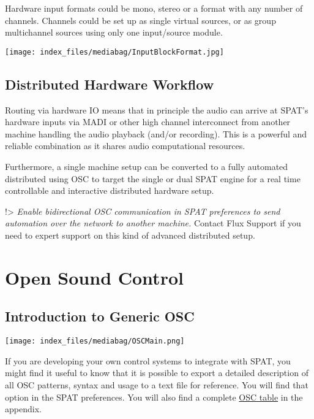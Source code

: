 \documentclass[
  letterpaper,
  DIV=11,
  numbers=noendperiod]{scrreport}
\begin{document}
Hardware input formats could be mono, stereo or a format with any number
of channels. Channels could be set up as single virtual sources, or as
group multichannel sources using only one input/source module.

\texttt{[image: index\_files/mediabag/InputBlockFormat.jpg]}

\hypertarget{distributed-hardware-workflow}{%
\section{Distributed Hardware
Workflow}\label{distributed-hardware-workflow}}

Routing via hardware IO means that in principle the audio can arrive at
SPAT's hardware inputs via MADI or other high channel interconnect from
another machine handling the audio playback (and/or recording). This is
a powerful and reliable combination as it shares audio computational
resources.

Furthermore, a single machine setup can be converted to a fully
automated distributed using OSC to target the single or dual SPAT engine
for a real time controllable and interactive distributed hardware setup.

!\textgreater{} \emph{Enable bidirectional OSC communication in SPAT
preferences to send automation over the network to another machine.}
Contact Flux Support if you need to expert support on this kind of
advanced distributed setup.

\hypertarget{open-sound-control}{%
\chapter{Open Sound Control}\label{open-sound-control}}

\hypertarget{introduction-to-generic-osc}{%
\section{Introduction to Generic
OSC}\label{introduction-to-generic-osc}}

\texttt{[image: index\_files/mediabag/OSCMain.png]}

If you are developing your own control systems to integrate with SPAT,
you might find it useful to know that it is possible to export a
detailed description of all OSC patterns, syntax and usage to a text
file for reference. You will find that option in the SPAT preferences.
You will also find a complete \href{Appendix_C_OSC_Table.md}{OSC table}
in the appendix.
\end{document}
